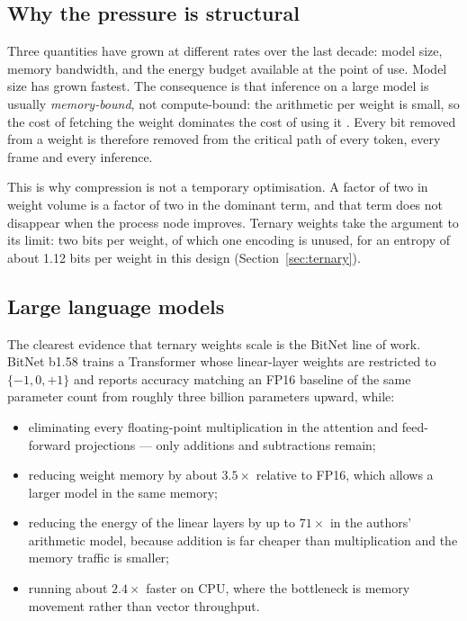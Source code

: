 \documentclass[11pt,a4paper]{article}
\begin{document}
\subsection{Why the pressure is structural}

Three quantities have grown at different rates over the last decade: model size,
memory bandwidth, and the energy budget available at the point of use. Model
size has grown fastest. The consequence is that inference on a large model is
usually \emph{memory-bound}, not compute-bound: the arithmetic per weight is
small, so the cost of fetching the weight dominates the cost of using it
\cite{horowitz2014compute}. Every bit removed from a weight is therefore
removed from the critical path of every token, every frame and every inference.

This is why compression is not a temporary optimisation. A factor of two in
weight volume is a factor of two in the dominant term, and that term does not
disappear when the process node improves. Ternary weights take the argument to
its limit: two bits per weight, of which one encoding is unused, for an entropy
of about 1.12 bits per weight in this design (Section~\ref{sec:ternary}).

\subsection{Large language models}

The clearest evidence that ternary weights scale is the BitNet line of work.
BitNet b1.58 \cite{bitnet} trains a Transformer whose linear-layer weights are
restricted to $\{-1,0,+1\}$ and reports accuracy matching an FP16 baseline of the
same parameter count from roughly three billion parameters upward, while:

\begin{itemize}[leftmargin=*]
  \item eliminating every floating-point multiplication in the attention and
    feed-forward projections --- only additions and subtractions remain;
  \item reducing weight memory by about $3.5\times$ relative to FP16, which
    allows a larger model in the same memory;
  \item reducing the energy of the linear layers by up to $71\times$ in the
    authors' arithmetic model, because addition is far cheaper than
    multiplication and the memory traffic is smaller;
  \item running about $2.4\times$ faster on CPU, where the bottleneck is
    memory movement rather than vector throughput.
\end{itemize}
\end{document}
